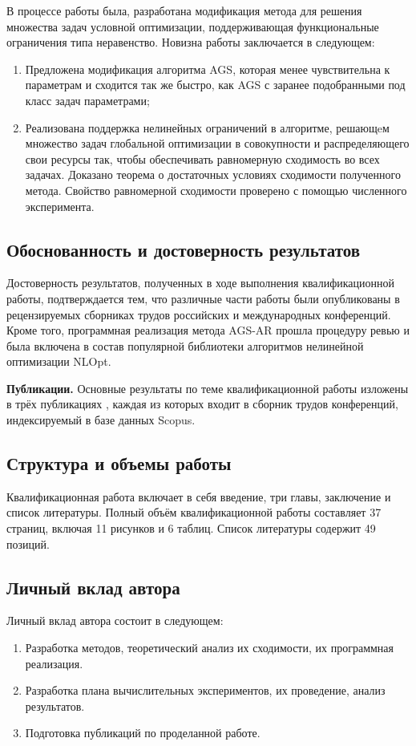 В процессе работы была, разработана модификация метода для решения множества задач условной оптимизации, поддерживающая
функциональные ограничения типа неравенство.
Новизна работы заключается в следующем:

\begin{enumerate}
    \item Предложена модификация алгоритма AGS, которая менее чувствительна к параметрам и сходится так же быстро, как AGS
    с заранее подобранными под класс задач параметрами;
    \item Реализована поддержка нелинейных ограничений в алгоритме, решающeм
    множество задач глобальной оптимизации в совокупности и распределяющего свои ресурсы так, чтобы
    обеспечивать равномерную сходимость во всех задачах. Доказано теорема о достаточных условиях сходимости
    полученного метода. Свойство равномерной сходимости проверено с помощью численного эксперимента.
\end{enumerate}

\subsection*{Обоснованность и достоверность результатов}
Достоверность результатов, полученных в ходе выполнения квалификационной работы, подтверждается
тем, что различные части работы были опубликованы в рецензируемых сборниках трудов российских и международных конференций.
Кроме того, программная реализация метода AGS-AR прошла процедуру ревью и была включена в состав популярной библиотеки
алгоритмов нелинейной оптимизации NLOpt.

\textbf{Публикации.} Основные результаты по теме квалификационной работы изложены в трёх публикациях \cite{barkalovSovraov2019,sovrasov2019,sovrasov2020},
каждая из которых входит в сборник трудов конференций, индексируемый в базе данных Scopus.

\subsection*{Структура и объемы работы}

Квалификационная работа включает в себя введение, три главы, заключение и список литературы.
Полный объём квалификационной работы составляет 37 страниц, включая 11 рисунков и 6 таблиц.
Список литературы содержит 49 позиций.

\subsection*{Личный вклад автора}

Личный вклад автора состоит в следующем:

\begin{enumerate}
    \item Разработка методов, теоретический анализ их сходимости, их программная реализация.
    \item Разработка плана вычислительных экспериментов, их проведение, анализ результатов.
    \item Подготовка публикаций по проделанной работе.
\end{enumerate}
